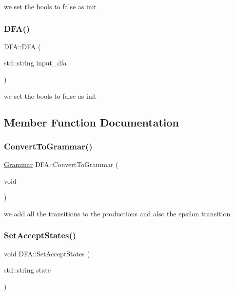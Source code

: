 we set the bools to false as init \mbox{\label{classDFA_ae137a053d15ac73f44137e5a2f6718af}} 
\subsubsection{\texorpdfstring{D\+F\+A()}{DFA()}\hspace{0.1cm}{\footnotesize\ttfamily [2/2]}}
{\footnotesize\ttfamily D\+F\+A\+::\+D\+FA (\begin{DoxyParamCaption}\item[{std\+::string}]{input\+\_\+dfa }\end{DoxyParamCaption})}

we set the bools to false as init 

\subsection{Member Function Documentation}
\mbox{\label{classDFA_a489f2637d08bf14a7336d2335bbe90e1}} 
\subsubsection{\texorpdfstring{Convert\+To\+Grammar()}{ConvertToGrammar()}}
{\footnotesize\ttfamily \hyperlink{classGrammar}{Grammar} D\+F\+A\+::\+Convert\+To\+Grammar (\begin{DoxyParamCaption}\item[{void}]{ }\end{DoxyParamCaption})}

we add all the transitions to the productions and also the epsilon transition \mbox{\label{classDFA_a4cae060f040199523c337da6c078a3d6}} 
\subsubsection{\texorpdfstring{Set\+Accept\+States()}{SetAcceptStates()}}
{\footnotesize\ttfamily void D\+F\+A\+::\+Set\+Accept\+States (\begin{DoxyParamCaption}\item[{std\+::string}]{state }\end{DoxyParamCaption})}

